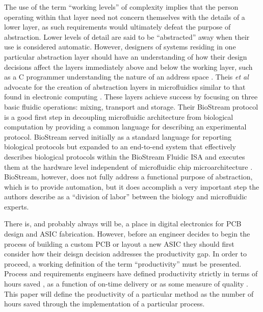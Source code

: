 The use of the term ``working levels'' of complexity implies that the person operating within that layer need not concern themselves with the details of a lower layer, as such requirements would ultimately defeat the purpose of abstraction. Lower levels of detail are said to be ``abstracted'' away when their use is considered automatic. However, designers of systems residing in one particular abstraction layer should have an understanding of how their design decisions affect the layers immediately above and below the working layer, such as a C programmer understanding the nature of an address space \cite{Harris+Harris}. Theis \emph{et al} advocate for the creation of abstraction layers in microfluidics similar to that found in electronic computing \cite{thies2008}. These layers achieve success by focusing on three basic fluidic operations: mixing, transport and storage. Their BioStream protocol is a good first step in decoupling microfluidic architecture from biological computation by providing a common language for describing an experimental protocol. BioStream served initially as a standard language for reporting biological protocols but expanded to an end-to-end system that effectively describes biological protocols within the BioStream Fluidic ISA and executes them at the hardware level independent of microfluidic chip microarchitecture \cite{thies2008}. BioStream, however, does not fully address a functional purpose of abstraction, which is to provide automation, but it does accomplish a very important step the authors describe as a ``division of labor'' between the biology and microfluidic experts. 

There is, and probably always will be, a place in digital electronics for PCB design and ASIC fabrication. However, before an engineer decides to begin the process of building a custom PCB or layout a new ASIC they should first consider how their deisgn decision addresses the productivity gap. In order to proceed, a working definition of the term ``productivity'' must be presented. Process and requirements engineers \cite{Review_ProcessEngr} have defined productivity strictly in terms of hours saved \cite{CostBenefit_hours}, as a function of on-time delivery \cite{OnTimeDelivery} or as some measure of quality \cite{Quality}. This paper will define the productivity of a particular method as the number of hours saved through the implementation of a particular process.

